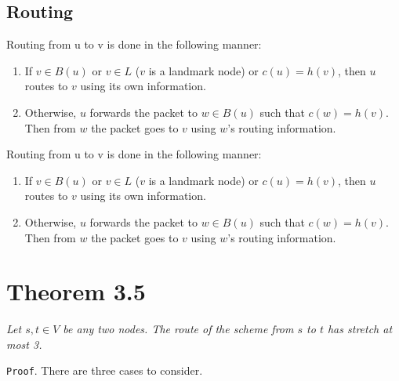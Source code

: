 \subsection{Routing}
Routing from u to v is done in the following manner:
\begin{enumerate}
    \item If $v \in B(u)$ or $v \in L$ ($v$ is a landmark node) or $c(u) =
        h(v)$, then $u$ routes to $v$ using its own information.
    \item Otherwise, $u$ forwards the packet to $w \in B(u)$ such that
        $c(w) = h(v)$. Then from $w$ the packet goes to $v$ using $w$’s
        routing information.
\end{enumerate}
Routing from u to v is done in the following manner:
\begin{enumerate}
    \item If $v \in B(u)$ or $v \in L$ ($v$ is a landmark node) or $c(u) =
        h(v)$, then $u$ routes to $v$ using its own information.
    \item Otherwise, $u$ forwards the packet to $w \in B(u)$ such that
        $c(w) = h(v)$. Then from $w$ the packet goes to $v$ using $w$’s
        routing information.
\end{enumerate}


\section{Theorem 3.5}
\textit{Let $s,t\in V$ be any two nodes. The route of the scheme from $s$ to $t$ has stretch at most 3.}

\texttt{Proof}. There are three cases to consider.

